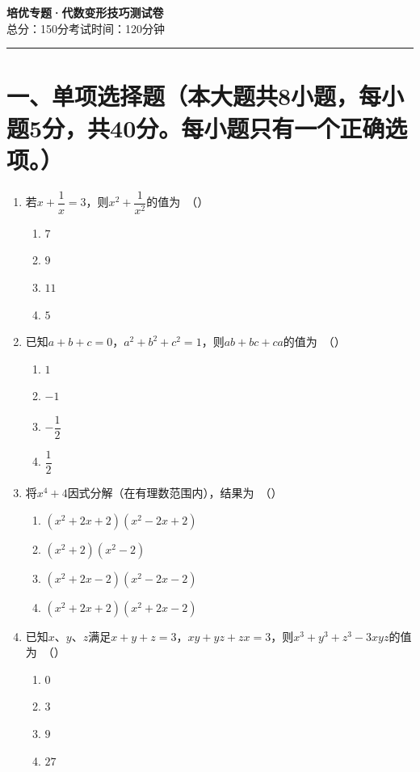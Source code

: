\documentclass[12pt, a4paper]{ctexart}
\begin{document}
\begin{center}
{\Large\bfseries 培优专题·代数变形技巧\quad 测试卷}\\[6pt]
{\normalsize 总分：150分\quad 考试时间：120分钟}
\end{center}
\vspace{6pt}
\noindent\rule{\textwidth}{0.5pt}

\section*{一、单项选择题（本大题共8小题，每小题5分，共40分。每小题只有一个正确选项。）}

\begin{enumerate}

\item 若$x+\dfrac{1}{x}=3$，则$x^2+\dfrac{1}{x^2}$的值为\ （\quad）
\begin{enumerate}[label=\Alph*., itemsep=0pt, topsep=2pt]
\item $7$ \quad \item $9$ \quad \item $11$ \quad \item $5$
\end{enumerate}

\item 已知$a+b+c=0$，$a^2+b^2+c^2=1$，则$ab+bc+ca$的值为\ （\quad）
\begin{enumerate}[label=\Alph*., itemsep=0pt, topsep=2pt]
\item $1$ \quad \item $-1$ \quad \item $-\dfrac{1}{2}$ \quad \item $\dfrac{1}{2}$
\end{enumerate}

\item 将$x^4+4$因式分解（在有理数范围内），结果为\ （\quad）
\begin{enumerate}[label=\Alph*., itemsep=0pt, topsep=2pt]
\item $(x^2+2x+2)(x^2-2x+2)$ \quad \item $(x^2+2)(x^2-2)$
\item $(x^2+2x-2)(x^2-2x-2)$ \quad \item $(x^2+2x+2)(x^2+2x-2)$
\end{enumerate}

\item 已知$x$、$y$、$z$满足$x+y+z=3$，$xy+yz+zx=3$，则$x^3+y^3+z^3-3xyz$的值为\ （\quad）
\begin{enumerate}[label=\Alph*., itemsep=0pt, topsep=2pt]
\item $0$ \quad \item $3$ \quad \item $9$ \quad \item $27$
\end{enumerate}


\end{enumerate}
\end{document}
